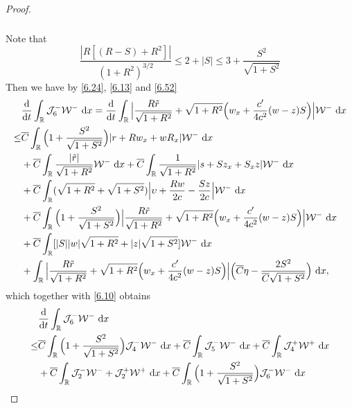 \documentclass[11pt,reqno]{article}
\newcommand{\fr}{\frac}
\numberwithin{equation}{section}
\begin{document}
\begin{proof}
\begin{align}
\begin{split}
\end{split}
\end{align}
Note that
$$
\fr{|R[(R-S)+R^2]|}{(1+R^2)^{3/2}}\leq 2+|S|\leq 3+\fr{S^2}{\sqrt{1+S^2}}
$$
Then we have by \eqref{6.24}, \eqref{6.13} and \eqref{6.52}
\begin{align*}
\begin{split}
&\fr{{\rm d}}{{\rm d}t}\int_{\mathbb{R}} \mathcal{J}_{6}^-\mathcal{W}^-\ {\rm d}x
= \fr{{\rm d}}{{\rm d}t}\int_{\mathbb{R}} \Big|\fr{R\tilde{r}}{\sqrt{1+R^2}} +\sqrt{1+R^2}\Big(w_x+\fr{c'}{4c^2}(w-z)S\Big)\Big|\mathcal{W}^-\ {\rm d}x \\
\leq & \overline{C}\int_{\mathbb{R}} \Big(1+\fr{S^2}{\sqrt{1+S^2}}\Big)|r+Rw_x+wR_x| \mathcal{W}^-\ {\rm d}x \\
&+\overline{C}\int_{\mathbb{R}} \fr{|\tilde{r}|}{\sqrt{1+R^2}} \mathcal{W}^-\ {\rm d}x +\overline{C}\int_{\mathbb{R}} \fr{1}{\sqrt{1+R^2}}|s+Sz_x +S_xz|\mathcal{W}^-\ {\rm d}x \\ & +\overline{C}\int_{\mathbb{R}} (\sqrt{1+R^2}+\sqrt{1+S^2})\Big|\upsilon+\fr{Rw}{2c}-\fr{Sz}{2c}\Big|\mathcal{W}^-\ {\rm d}x \\ &+\overline{C}\int_{\mathbb{R}}\Big(1+\fr{S^2}{\sqrt{1+S^2}}\Big)\Big|\fr{R\tilde{r}}{\sqrt{1+R^2}} +\sqrt{1+R^2}\Big(w_x+\fr{c'}{4c^2}(w-z)S\Big)\Big| \mathcal{W}^-\ {\rm d}x \\
&+\overline{C}\int_{\mathbb{R}}  [|S||w|\sqrt{1+R^2}+|z|\sqrt{1+S^2}] \mathcal{W}^-\ {\rm d}x \\
&+\int_{\mathbb{R}}\Big|\fr{R\tilde{r}}{\sqrt{1+R^2}} +\sqrt{1+R^2}\Big(w_x+\fr{c'}{4c^2}(w-z)S\Big)\Big| \Big(\overline{C}\eta-\fr{2S^2}{\overline{C}\sqrt{1+S^2}}\Big)\ {\rm d}x,
\end{split}
\end{align*}
which together with \eqref{6.10} obtains
\begin{align}\label{6.53}
\begin{split}
&\fr{{\rm d}}{{\rm d}t}\int_{\mathbb{R}} \mathcal{J}_{6}^-\mathcal{W}^-\ {\rm d}x \\
\leq & \overline{C}\int_{\mathbb{R}} \Big(1+\fr{S^2}{\sqrt{1+S^2}}\Big) \mathcal{J}_{4}^- \mathcal{W}^-\ {\rm d}x  +\overline{C}\int_{\mathbb{R}} \mathcal{J}_{5}^- \mathcal{W}^-\ {\rm d}x +\overline{C}\int_{\mathbb{R}} \mathcal{J}_{4}^+\mathcal{W}^+\ {\rm d}x \\ & +\overline{C}\int_{\mathbb{R}}\mathcal{J}_{2}^-\mathcal{W}^- +\mathcal{J}_{2}^+\mathcal{W}^+\ {\rm d}x +\overline{C}\int_{\mathbb{R}}\Big(1+\fr{S^2}{\sqrt{1+S^2}}\Big)\mathcal{J}_{6}^-\mathcal{W}^-\ {\rm d}x \\

\end{split}
\end{align}
\end{proof}
\end{document}
